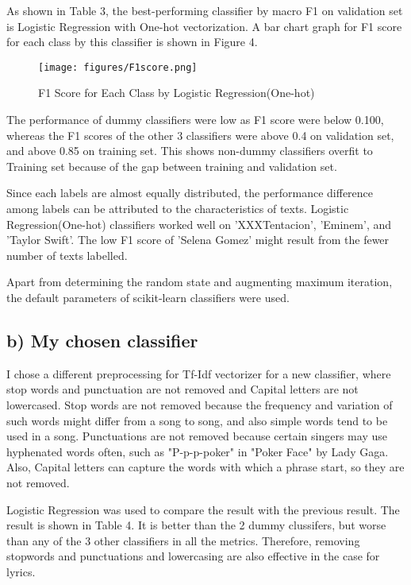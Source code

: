 \documentclass[a4paper,11pt]{article}
\begin{document}
As shown in Table 3, the best-performing classifier by macro F1 on validation set is Logistic Regression with One-hot vectorization.
A bar chart graph for F1 score for each class by this classifier is shown in Figure 4.
\begin{figure}[htbp]
  \begin{center}
  \texttt{[image: figures/F1score.png]}
  \caption{F1 Score for Each Class by Logistic Regression(One-hot)}
  \end{center}
\end{figure}

The performance of dummy classifiers were low as F1 score were below 0.100,
whereas the F1 scores of the other 3 classifiers were above 0.4 on validation set,
and above 0.85 on training set.
This shows non-dummy classifiers overfit to Training set because of the gap between training and validation set.

Since each labels are almost equally distributed, the performance difference among labels can be attributed to the characteristics of texts.
Logistic Regression(One-hot) classifiers worked well on 'XXXTentacion', 'Eminem', and 'Taylor Swift'.
The low F1 score of 'Selena Gomez' might result from the fewer number of texts labelled.

Apart from determining the random state and augmenting maximum iteration, the default parameters of scikit-learn classifiers were used.


\subsection{b) My chosen classifier}
I chose a different preprocessing for Tf-Idf vectorizer for a new classifier, where stop words and punctuation are not removed and Capital letters are not lowercased.
Stop words are not removed because the frequency and variation of such words might differ from a song to song, and also simple words tend to be used in a song.
Punctuations are not removed because certain singers may use hyphenated words often, such as "P-p-p-poker" in "Poker Face" by Lady Gaga. 
Also, Capital letters can capture the words with which a phrase start, so they are not removed.

Logistic Regression was used to compare the result with the previous result.
The result is shown in Table 4.
It is better than the 2 dummy clussifers, but worse than any of the 3 other classifiers in all the metrics.
Therefore, removing stopwords and punctuations and lowercasing are also effective in the case for lyrics.
\end{document}
